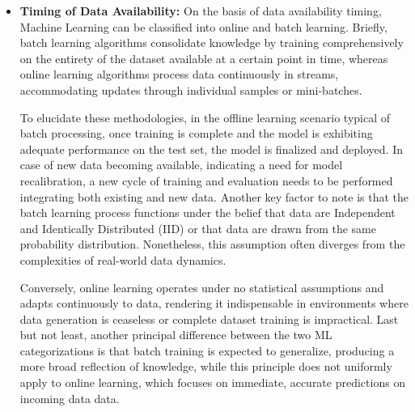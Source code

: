 \begin{itemize}
          On the contrary, task learning is more outcome-oriented, targeting definite outputs, and can be recognized both in supervised and
          un-supervised setups. To offer an illustration, classification and regression, generally categorized under supervised learning, aim to predict
          discrete classes and continuous values respectively\cite{nastesaki_supervised_ml_2017}, whereas clustering-a form of unsupervised learning-groups
          data without predefined categories\cite{ghahramani_unsupervised_ml_2004}. All things considered, each technique addresses specific analytical needs
          and applications within the broader ML framework.

    \item \textbf{Timing of Data Availability:} On the basis of data availability timing, Machine Learning can be classified into online and batch
          learning. Briefly, batch learning algorithms consolidate knowledge by training comprehensively on the entirety of the dataset available at a certain
          point in time, whereas online learning algorithms process data continuously in streams, accommodating updates through individual samples or
          mini-batches\cite{bisongBatchVsOnline2019}.

          To elucidate these methodologies, in the offline learning scenario typical of batch processing, once
          training is complete and the model is exhibiting adequate performance on the test set, the model is finalized and deployed. In case of new data
          becoming available, indicating a need for model recalibration, a new cycle of training and evaluation needs to be performed integrating both
          existing and new data. Another key factor to note is that the batch learning process functions under the belief that data are Independent and
          Identically Distributed (IID) or that data are drawn from the same probability distribution\cite{dekel_online_to_batch_2008}. Nonetheless, this
          assumption often diverges from the complexities of real-world data dynamics.

          Conversely, online learning operates under no statistical assumptions
          and adapts continuously to data, rendering it indispensable in environments where data generation is ceaseless or complete dataset
          training is impractical. Last but not least, another principal difference between the two ML categorizations is that batch training is expected to
          generalize, producing a more broad reflection of knowledge, while this principle does not uniformly apply to online learning, which focuses on immediate,
          accurate predictions on incoming data data\cite{dekel_online_to_batch_2008}.
\end{itemize}


